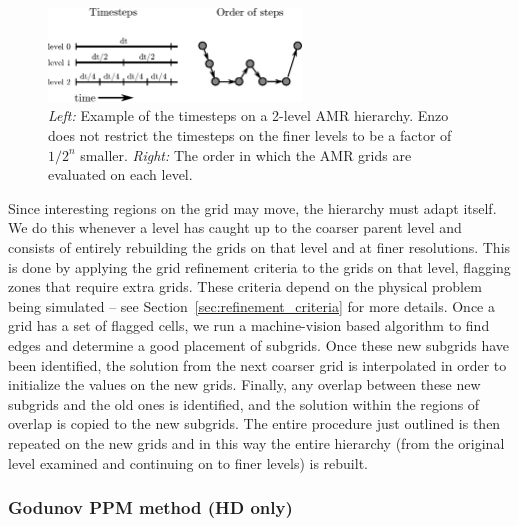 \begin{figure}
\begin{center}
\includegraphics[width=0.6\textwidth]{figures/timestepping.eps}
\end{center}
\caption{\emph{Left:} Example of the timesteps on a 2-level AMR
  hierarchy.  Enzo does not restrict the timesteps on the finer levels
  to be a factor of $1/2^n$ smaller.  \emph{Right:} The order in which
  the AMR grids are evaluated on each level.\vspace{1ex}}
\label{fig:wcycle}
\end{figure}

Since interesting regions on the grid may move, the hierarchy must
adapt itself.  We do this whenever a level has caught up to the
coarser parent level and consists of entirely rebuilding the grids on
that level and at finer resolutions.  This is done by applying the
grid refinement criteria to the grids on that level, flagging zones
that require extra grids.  These criteria depend on the physical
problem being simulated -- see Section~\ref{sec:refinement_criteria}
for more details.  Once a grid has a set of flagged cells, we run a
machine-vision based algorithm \citep{Berger91} to find edges and
determine a good placement of subgrids.
Once these new subgrids have been identified, the solution from the
next coarser grid is interpolated in order to initialize the values on
the new grids.  Finally, any overlap between these new subgrids and
the old ones is identified, and the solution within the regions of
overlap is copied to the new subgrids.  The entire procedure just
outlined is then repeated on the new grids and in this way the entire
hierarchy (from the original level examined and continuing on to finer
levels) is rebuilt.

\subsubsection{Godunov PPM method (HD only)}

